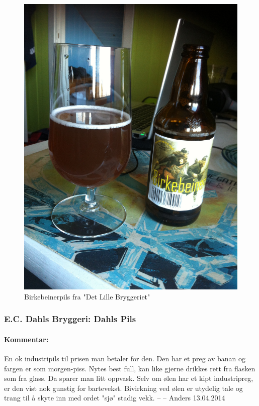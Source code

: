 \documentclass[12pt,a4paper,oneside,norsk]{article}
\begin{document}
\begin{figure} [H]
\centering
\includegraphics[scale=0.1, angle=270]{Bilder/Ol/birkebeiner.jpg}
\caption{Birkebeinerpils fra "Det Lille Bryggeriet"}
\end{figure}

\newpage
\subsubsection{E.C. Dahls Bryggeri: Dahls Pils}
\paragraph{Kommentar:}En ok industripils til prisen man betaler for den. Den har et preg av banan og fargen er som morgen-piss. Nytes best full, kan like gjerne drikkes rett fra flasken som fra glass. Da sparer man litt oppvask. Selv om ølen har et kipt industripreg, er den vist nok gunstig for bartevekst. Bivirkning ved ølen er utydelig tale og trang til å skyte inn med ordet "sjø" stadig vekk.
\newline
-- -- Anders 13.04.2014
\end{document}
